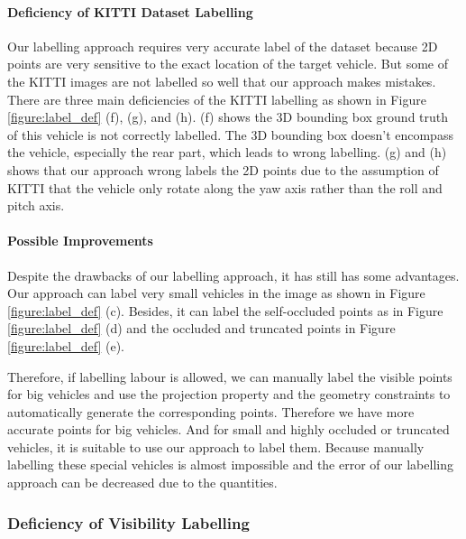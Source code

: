 \paragraph{Deficiency of KITTI Dataset Labelling}
Our labelling approach requires very accurate label of the dataset because 2D points are very sensitive to the exact location of the target vehicle. But some of the KITTI images are not labelled so well that our approach makes mistakes. There are three main deficiencies of the KITTI labelling as shown in Figure \ref{figure:label_def} (f), (g), and (h). (f) shows the 3D bounding box ground truth of this vehicle is not correctly labelled. The 3D bounding box doesn't encompass the vehicle, especially the rear part, which leads to wrong labelling. (g) and (h) shows that our approach wrong labels the 2D points due to the assumption of KITTI that the vehicle only rotate along the yaw axis rather than the roll and pitch axis.


\paragraph{Possible Improvements}
Despite the drawbacks of our labelling approach, it has still has some advantages. Our approach can label very small vehicles in the image as shown in Figure \ref{figure:label_def} (c). Besides, it can label the self-occluded points as in Figure \ref{figure:label_def} (d) and the occluded and truncated points in Figure \ref{figure:label_def} (e). 

Therefore, if labelling labour is allowed, we can manually label the visible points for big vehicles and use the projection property and the geometry constraints to automatically generate the corresponding points. Therefore we have more accurate points for big vehicles. And for small and highly occluded or truncated vehicles, it is suitable to use our approach to label them. Because manually labelling these special vehicles is almost impossible and the error of our labelling approach can be decreased due to the quantities.


\subsubsection{Deficiency of Visibility Labelling}
